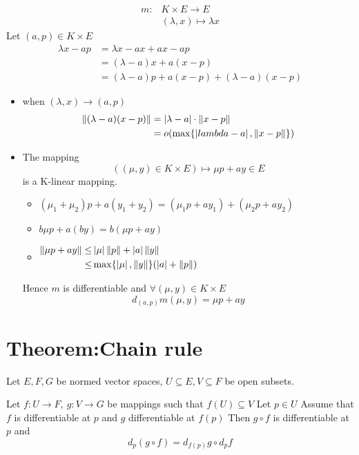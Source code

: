 \documentclass{book}
\newcommand{\abs}[1]{\left\lvert #1 \right\rvert}
\begin{document}
\subsection{}
$$\begin{aligned}
m:&K\times E\rightarrow E\\
&(\lambda,x)\mapsto \lambda x
\end{aligned}$$
Let $(a,p)\in K\times E$
$$\begin{aligned}
    \lambda x-ap &=\lambda x-ax+ax-ap\\
    &=(\lambda-a)x+a(x-p)\\
    &=(\lambda-a)p+a(x-p)+(\lambda-a)(x-p)
\end{aligned}$$
\begin{itemize}
    \item when $(\lambda,x)\rightarrow(a,p)$$$\begin{aligned}
        \norm{(\lambda-a)(x-p)}&=\abs{\lambda-a}\cdot\norm{x-p}\\
        &=o(\max\{\abs{lambda-a},\norm{x-p}\})
    \end{aligned}$$
    \item The mapping $$((\mu,y)\in K\times E)\mapsto \mu p+ay\in E$$ is a K-linear mapping.
    \begin{itemize}
        \item $(\mu_1+\mu_2)p+a(y_1+y_2)=(\mu_1p+ay_1)+(\mu_2p+ay_2)$
        \item $b\mu p+a(by)=b(\mu p +ay)$
        \item $\begin{aligned}
        \norm{\mu p+ay}\leq &\abs{\mu}\norm{p}+\abs{a}\norm{y}\\
         \leq& \max\{\abs{\mu},\norm{y}\}(\abs{a}+\norm{p})
    \end{aligned}$
    \end{itemize}
    Hence $m$ is differentiable and $\forall (\mu,y)\in K\times E$
    $$d_{(a,p)}m(\mu,y)=\mu p+ay$$
\end{itemize}
\section{Theorem:Chain rule}
Let $E,F,G$ be normed vector spaces, $U\subseteq E,V\subseteq F$ be open subsets. 

Let $f :U\rightarrow F,\ g:V\rightarrow G$ be mappings such that $f(U)\subseteq V$ Let $p\in U$ Assume that $f$ is differentiable at $p$ and $g$ differentiable at $f(p)$ Then $g\circ f$ is differentiable at $p$ and $$d_p(g\circ f)=d_{f(p)}g\circ d_pf$$
\end{document}
